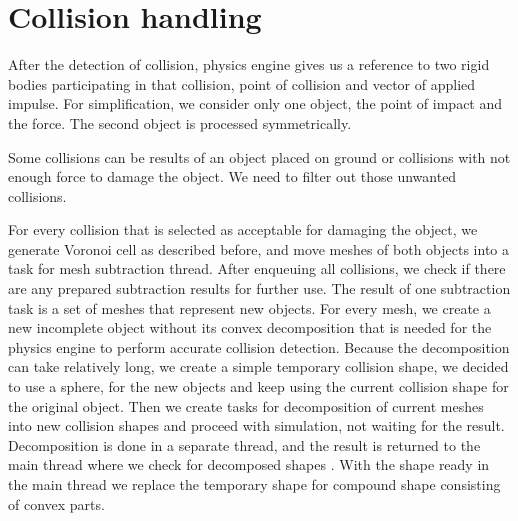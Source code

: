 \section{Collision handling}
\label{sec:collisions}
After the detection of collision, physics engine gives us a reference to two rigid bodies participating in that collision, point of collision and vector of applied impulse. For simplification, we consider only one object, the point of impact and the force. The second object is processed symmetrically.

Some collisions can be results of an object placed on ground or collisions with not enough force to damage the object. We need to filter out those unwanted collisions.

For every collision that is selected as acceptable for damaging the object, we generate Voronoi cell as described before, and move meshes of both objects into a task for mesh subtraction thread. After enqueuing all collisions, we check if there are any prepared subtraction results for further use. The result of one subtraction task is a set of meshes that represent new objects. For every mesh, we create a new incomplete object without its convex decomposition that is needed for the physics engine to perform accurate collision detection. Because the decomposition can take relatively long, we create a simple temporary collision shape, we decided to use a sphere, for the new objects and keep using the current  collision shape for the original object. Then we create tasks for decomposition of current meshes into new collision shapes and proceed with simulation, not waiting for the result. Decomposition is done in a separate thread, and the result is returned to the main thread where we check for decomposed shapes . With the shape ready in the main thread we replace the temporary shape for compound shape consisting of convex parts.


